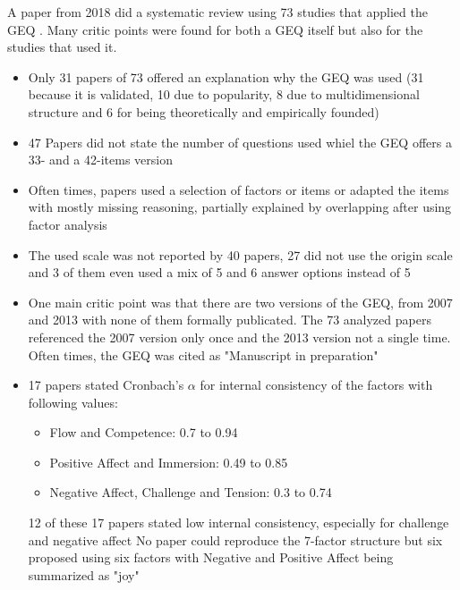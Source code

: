 A paper from 2018 did a systematic review using 73 studies that applied the GEQ \cite{law2018systematic}. Many critic points were found for both a GEQ itself but also for the studies that used it.
\begin{itemize}
	\item Only 31 papers of 73 offered an explanation why the GEQ was used (31 because it is validated, 10 due to popularity, 8 due to multidimensional structure and 6 for being theoretically and empirically founded) 
	\item 47 Papers did not state the number of questions used whiel the GEQ offers a 33- and a 42-items version 
	\item Often times, papers used a selection of factors or items or adapted the items with mostly missing reasoning, partially explained by overlapping after using factor analysis 
	\item The used scale was not reported by 40 papers, 27 did not use the origin scale and 3 of them even used a mix of 5 and 6 answer options instead of 5 
	\item One main critic point was that there are two versions of the GEQ, from 2007 and 2013 with none of them formally publicated. The 73 analyzed papers referenced the 2007 version only once and the 2013 version not a single time. Often times, the GEQ was cited as "Manuscript in preparation" 
	\item 17 papers stated Cronbach's $\alpha$ for internal consistency of the factors with following values:
	\begin{itemize}
		\item Flow and Competence: 0.7 to 0.94
		\item Positive Affect and Immersion: 0.49 to 0.85
		\item Negative Affect, Challenge and Tension: 0.3 to 0.74
	\end{itemize}
12 of these 17 papers stated low internal consistency, especially for challenge and negative affect 
No paper could reproduce the 7-factor structure but six proposed using six factors with Negative and Positive Affect being summarized as "joy" 
\end{itemize}

